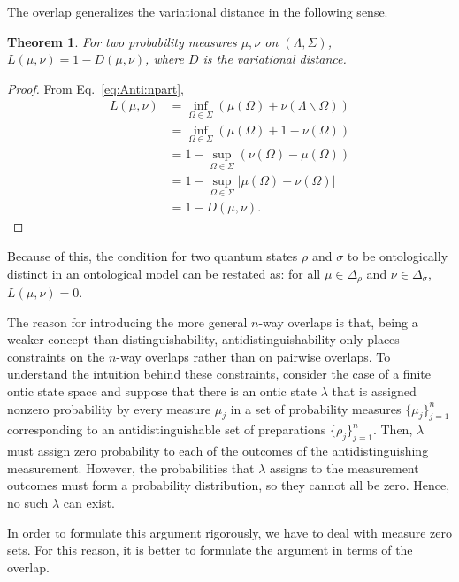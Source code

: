 \documentclass[DIV=calc,fontsize=12pt]{scrartcl} %
\theoremstyle{definition}
\theoremstyle{plain}
\newtheorem{theorem}[definition]{Theorem}
\begin{document}
The overlap generalizes the variational distance in the following
sense.

\begin{theorem}
\label{prop:Anti:varoverlap}
For two probability measures $\mu, \nu$ on $(\Lambda, \Sigma)$,
$L(\mu,\nu) = 1 - D(\mu,\nu)$, where $D$ is the variational
distance.
\end{theorem}
\begin{proof}
From Eq.~\eqref{eq:Anti:npart},
\begin{align}
L(\mu,\nu) & = \inf_{\Omega \in \Sigma} \left ( \mu(\Omega) +
\nu(\Lambda \backslash \Omega) \right ) \\
& = \inf_{\Omega \in \Sigma} \left ( \mu(\Omega) + 1 - \nu(\Omega)
\right ) \\
& = 1 - \sup_{\Omega \in \Sigma} \left ( \nu(\Omega) - \mu(\Omega)
\right ) \\
& = 1 - \sup_{\Omega \in \Sigma} \left | \mu(\Omega) - \nu(\Omega)
\right | \\
& = 1 - D(\mu,\nu).
\end{align}
\end{proof}

Because of this, the condition for two quantum states $\rho$ and
$\sigma$ to be ontologically distinct in an ontological model can be
restated as: for all $\mu \in \Delta_{\rho}$ and $\nu \in
\Delta_{\sigma}$, $L(\mu,\nu) = 0$.

The reason for introducing the more general $n$-way overlaps is that,
being a weaker concept than distinguishability, antidistinguishability
only places constraints on the $n$-way overlaps rather than on
pairwise overlaps.  To understand the intuition behind these
constraints, consider the case of a finite ontic state space and
suppose that there is an ontic state $\lambda$ that is assigned
nonzero probability by every measure $\mu_j$ in a set of probability
measures $\{\mu_j\}_{j=1}^n$ corresponding to an antidistinguishable
set of preparations $\{\rho_j\}_{j=1}^n$.  Then, $\lambda$ must assign
zero probability to each of the outcomes of the antidistinguishing
measurement.  However, the probabilities that $\lambda$ assigns to the
measurement outcomes must form a probability distribution, so they
cannot all be zero.  Hence, no such $\lambda$ can exist.

In order to formulate this argument rigorously, we have to deal with
measure zero sets.  For this reason, it is better to formulate the
argument in terms of the overlap.
\end{document}
